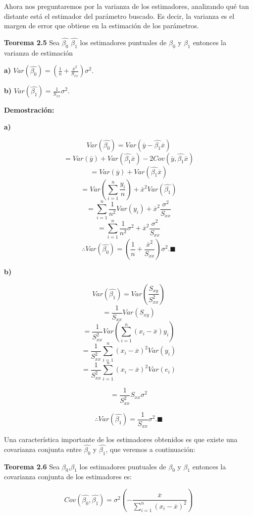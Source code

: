 \documentclass[
  a4paper,
  oneside,
  openany]{book}
\begin{document}
Ahora nos preguntaremos por la varianza de los estimadores, analizando qué tan distante está el estimador del parámetro buscado. Es decir, la varianza es el margen de error que obtiene en la estimación de los parámetros.

\textbf{Teorema 2.5} Sea \(\hat{\beta_{0}}\) \(\hat{\beta_{1}}\) los estimadores puntuales de \(\beta_{0}\) y \(\beta_{1}\) entonces la varianza de estimación

\textbf{a)} \(Var\left(\hat{\beta_{0}}\right)=\left(\frac{1}{n}+\frac{\overline{x}^2}{S_{xx}}\right) \sigma^2.\)

\textbf{b)} \(Var\left(\hat{\beta_{1}}\right)= \frac{1}{S_{xx}} \sigma^2.\)

\textbf{Demostración:}

\textbf{a)}

\[Var\left(\hat{\beta_{0}}\right)=Var\left(\overline{y}-\hat{\beta_{1}}\overline{x}\right)\]
\[=Var(\overline{y})+Var(\hat{\beta_{1}}\overline{x})-2Cov(\overline{y},\hat{\beta_{1}}\overline{x})\]
\[=Var(\overline{y})+Var(\hat{\beta_{1}}\overline{x})\]
\[=Var\left(\sum_{i=1}^{n}\frac{y_{i}}{n} \right)+\overline{x}^2Var(\hat{\beta_{1}})\]
\[=\sum_{i=1}^{n}\frac{1}{n^2}Var(y_{i})+\overline{x}^2\frac{\sigma^2}{S_{xx}}\]
\[=\sum_{i=1}^{n}\frac{1}{n^2}\sigma^2+\overline{x}^2\frac{\sigma^2}{S_{xx}}\]
\[\therefore Var\left(\hat{\beta_{0}}\right)=\left(\frac{1}{n}+\frac{\overline{x}^2}{S_{xx}}\right) \sigma^2. \blacksquare\]

\textbf{b)}

\[Var\left(\hat{\beta_{1}}\right)= Var\left( \frac{S_{xy}}{S_{xx}^2}\right)\]
\[= \frac{1}{S_{xx}}Var\left(S_{xy}\right)\]
\[=\frac{1}{S_{xx}^2}Var\left( \sum_{i=1}^{n}(x_{i}-\overline{x})y_{i}\right)\]
\[=\frac{1}{S_{xx}^2} \sum_{i=1}^{n}(x_{i}-\overline{x})^2Var(y_{i})\]
\[=\frac{1}{S_{xx}^2}\sum_{i=1}^{n}(x_{i}-\overline{x})^2Var(e_{i})\]

\[=\frac{1}{S_{xx}^2}S_{xx}\sigma^2\]

\[\therefore Var\left(\hat{\beta_{1}}\right)= \frac{1}{S_{xx}} \sigma^2. \blacksquare\]

Una característica importante de los estimadores obtenidos es que existe una covarianza conjunta entre \(\hat{\beta_{0}}\) y \(\hat{\beta_{1}}\), que veremos a continuación:

\textbf{Teorema 2.6} Sea \(\beta_{0}\),\(\beta_{1}\) los estimadores puntuales de \(\beta_{0}\) y \(\beta_{1}\) entonces la covarianza conjunta de los estimadores es:

\[Cov\left(\hat{\beta_{0}},\hat{\beta_{1}}\right)=\sigma^2\left(-\frac{\overline{x}}{\sum_{i=1}^{n}(x_{i}-\overline{x})^2}\right)\]
\end{document}
